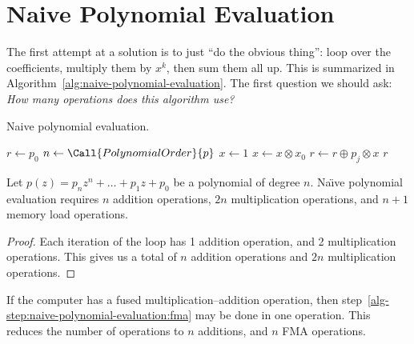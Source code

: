 \section{Naive Polynomial Evaluation}

The first attempt at a solution is to just ``do the obvious thing'':
loop over the coefficients, multiply them by $x^{k}$, then sum them all
up. This is summarized in Algorithm~\ref{alg:naive-polynomial-evaluation}.
The first question we should ask:
\emph{How many operations does this algorithm use?}

\begin{algorithm}\label{alg:naive-polynomial-evaluation}
  \caption{Naive polynomial evaluation.}
  \begin{algorithmic}[1]
     
      \State\label{alg-step:naive-polynomial-evaluation:initial-load} $r\gets p_{0}$
      \State $n\gets\Call{PolynomialOrder}{p}$
      \State $x\gets 1$
        \State $x\gets x\otimes x_{0}$
        \State\label{alg-step:naive-polynomial-evaluation:fma} $r\gets r\oplus p_{j}\otimes x$
      \EndFor
      \State \Return $r$  
    \EndFunction
\end{algorithmic}
\end{algorithm}

\begin{thm}
  Let $p(z) = p_{n}z^{n} + \dots + p_{1}z + p_{0}$ be a polynomial of
  degree $n$. Na\"{\i}ve polynomial evaluation requires $n$ addition
  operations, $2n$ multiplication operations, and $n+1$ memory load
  operations.
\end{thm}
\begin{proof}
Each iteration of the loop has 1 addition operation, and 2
multiplication operations. This gives us a total of $n$ addition
operations and $2n$ multiplication operations.
\end{proof}

\begin{rmk}
If the computer has a fused multiplication--addition operation, then
step~\ref{alg-step:naive-polynomial-evaluation:fma} may be done in one
operation. This reduces the number of operations to $n$ additions, and
$n$ FMA operations.
\end{rmk}


